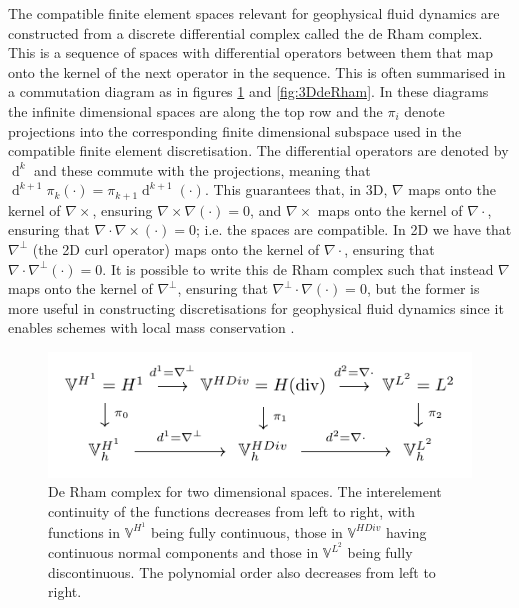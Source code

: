 \documentclass[journal abbreviation, manuscript]{copernicus}
\DeclareMathOperator{\diff}{d}
\begin{document}
The compatible finite element spaces relevant for geophysical fluid
dynamics are constructed from a discrete differential complex called
the de Rham complex. This is a sequence of spaces with differential
operators between them that map onto the kernel of the next operator
in the sequence. This is often summarised in a commutation diagram as
in figures \ref{fig:2DdeRham} and \ref{fig:3DdeRham}. In these
diagrams the infinite dimensional spaces are along the top row and the
$\pi_i$ denote projections into the corresponding finite dimensional
subspace used in the compatible finite element discretisation. The
differential operators are denoted by $\diff^k$ and these commute with
the projections, meaning that $\diff^{k+1}\pi_k(\cdot) =
\pi_{k+1}\diff^{k+1}(\cdot)$. This guarantees that, in 3D, $\nabla$
maps onto the kernel of $\nabla\times$, ensuring
$\nabla\times\nabla(\cdot)=0$, and $\nabla\times$ maps onto the kernel
of $\nabla\cdot$, ensuring that $\nabla\cdot\nabla\times(\cdot)=0$;
i.e. the spaces are compatible. In 2D we have that $\nabla^\perp$
(the 2D curl operator) maps onto the kernel of $\nabla\cdot$,
ensuring that $\nabla\cdot\nabla^\perp(\cdot)=0$. It is possible to
write this de Rham complex such that instead $\nabla$ maps onto the
kernel of $\nabla^\perp$, ensuring that
$\nabla^\perp\cdot\nabla(\cdot)=0$, but the former is more useful in
constructing discretisations for geophysical fluid dynamics since it
enables schemes with local mass conservation \citep{}.

\begin{figure}
  \includegraphics{figures/de_rham_fig_2d.pdf}
  \caption{De Rham complex for two dimensional spaces. The
    interelement continuity of the functions decreases from left to
    right, with functions in $\mathbb{V}^{H^1}$ being fully
    continuous, those in $\mathbb{V}^{HDiv}$ having continuous normal
    components and those in $\mathbb{V}^{L^2}$ being fully
  discontinuous. The polynomial order also decreases from left to
  right.}
  \label{fig:2DdeRham}
\end{figure}
\end{document}
